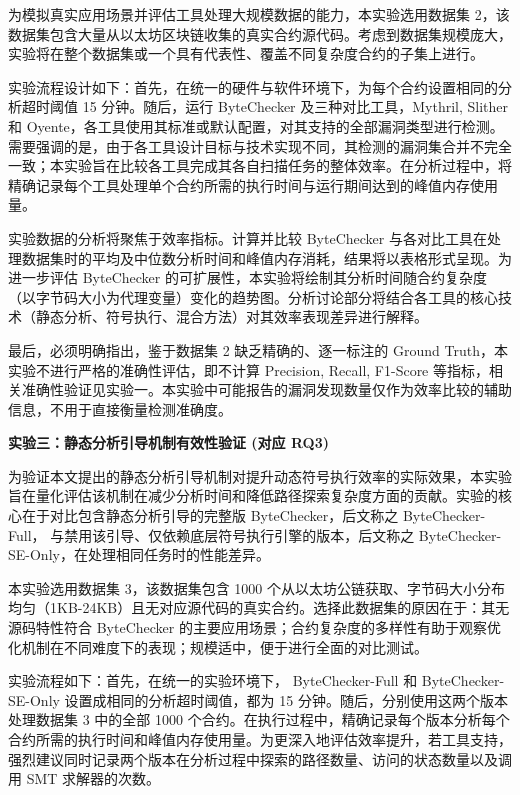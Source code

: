 \documentclass[print, master, vlined, timesmath]{DissertUESTC}
\begin{document}
为模拟真实应用场景并评估工具处理大规模数据的能力，本实验选用数据集 2，该数据集包含大量从以太坊区块链收集的真实合约源代码。考虑到数据集规模庞大，实验将在整个数据集或一个具有代表性、覆盖不同复杂度合约的子集上进行。

实验流程设计如下：首先，在统一的硬件与软件环境下，为每个合约设置相同的分析超时阈值 15 分钟。随后，运行 ByteChecker 及三种对比工具，Mythril, Slither 和 Oyente，各工具使用其标准或默认配置，对其支持的全部漏洞类型进行检测。需要强调的是，由于各工具设计目标与技术实现不同，其检测的漏洞集合并不完全一致；本实验旨在比较各工具完成其各自扫描任务的整体效率。在分析过程中，将精确记录每个工具处理单个合约所需的执行时间与运行期间达到的峰值内存使用量。

实验数据的分析将聚焦于效率指标。计算并比较 ByteChecker 与各对比工具在处理数据集时的平均及中位数分析时间和峰值内存消耗，结果将以表格形式呈现。为进一步评估 ByteChecker 的可扩展性，本实验将绘制其分析时间随合约复杂度（以字节码大小为代理变量）变化的趋势图。分析讨论部分将结合各工具的核心技术（静态分析、符号执行、混合方法）对其效率表现差异进行解释。

最后，必须明确指出，鉴于数据集 2 缺乏精确的、逐一标注的 Ground Truth，本实验不进行严格的准确性评估，即不计算 Precision, Recall, F1-Score 等指标，相关准确性验证见实验一。本实验中可能报告的漏洞发现数量仅作为效率比较的辅助信息，不用于直接衡量检测准确度。

\textbf{实验三：静态分析引导机制有效性验证 (对应 RQ3)}

为验证本文提出的静态分析引导机制对提升动态符号执行效率的实际效果，本实验旨在量化评估该机制在减少分析时间和降低路径探索复杂度方面的贡献。实验的核心在于对比包含静态分析引导的完整版 ByteChecker，后文称之 ByteChecker-Full， 与禁用该引导、仅依赖底层符号执行引擎的版本，后文称之 ByteChecker-SE-Only，在处理相同任务时的性能差异。

本实验选用数据集 3，该数据集包含 1000 个从以太坊公链获取、字节码大小分布均匀（1KB-24KB）且无对应源代码的真实合约。选择此数据集的原因在于：其无源码特性符合 ByteChecker 的主要应用场景；合约复杂度的多样性有助于观察优化机制在不同难度下的表现；规模适中，便于进行全面的对比测试。

实验流程如下：首先，在统一的实验环境下， ByteChecker-Full 和 ByteChecker-SE-Only 设置成相同的分析超时阈值，都为  15 分钟。随后，分别使用这两个版本处理数据集 3 中的全部 1000 个合约。在执行过程中，精确记录每个版本分析每个合约所需的执行时间和峰值内存使用量。为更深入地评估效率提升，若工具支持，强烈建议同时记录两个版本在分析过程中探索的路径数量、访问的状态数量以及调用 SMT 求解器的次数。
\end{document}

